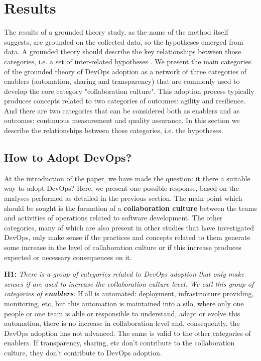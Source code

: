 \section{Results}
The results of a grounded theory study, as the name of the method itself suggests, are grounded on the collected data, so the hypotheses emerged from data. A grounded theory should describe the key relationships between those categories, i.e. a set of inter-related hypotheses \cite{hoda2017becoming}. We present the main categories of the grounded theory of DevOps adoption as a network of three categories of enablers (automation, sharing and transparency) that are commonly used to develop the core category "collaboration culture". This adoption process typically produces concepts related to two categories of outcomes: agility and resilience. And there are two categories that can be considered both as enablers and as outcomes: continuous measurement and quality assurance. In this section we describe the relationships between those categories, i.e. the hypotheses.

\subsection{How to Adopt DevOps?}
At the introduction of the paper, we have made the question: it there a
suitable way to adopt DevOps? Here, we present one possible response, based
on the analyses performed as detailed in the previous section. The main point
which should be sought is the formation of a \textbf{collaboration culture}
between the teams and activities of operations related to software development.
The other categories, many of which are also present in other studies that have
investigated DevOps, only make sense if the practices and concepts related to them generate some increase in the level of collaboration culture or if this increase produces expected or necessary consequences on it.

\textbf{H1:} \textit{There is a group of categories related to DevOps adoption that only make senses if are used to increase the collaboration culture level. We call this group of categories of \textbf{enablers}}. If all is automated: deployment, infrastructure providing, monitoring, etc, but this automation is maintained into a silo, where only one people or one team is able or responsible to understand, adapt or evolve this automation, there is no increase in collaboration level and, consequently, the DevOps adoption has not advanced. The same is valid to the other categories of enablers. If transparency, sharing, etc don't contribute to the collaboration culture, they don't contribute to DevOps adoption.

